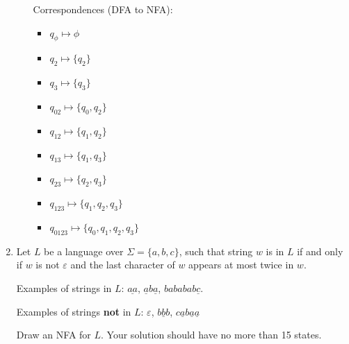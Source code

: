 \documentclass[11pt]{article}
\renewcommand{\epsilon}{\varepsilon}
\begin{document}
\begin{enumerate}
\begin{enumerate}
    Correspondences (DFA to NFA):
    \begin{itemize}
        \item %
        $q_{\phi} \mapsto \phi$
        \item
        $q_2 \mapsto \{q_2\}$
        \item
        $q_3 \mapsto \{q_3\}$
        \item
        $q_{02} \mapsto \{q_0, q_2\}$
        \item
        $q_{12} \mapsto \{q_1, q_2\}$
        \item
        $q_{13} \mapsto \{q_1, q_3\}$
        \item
        $q_{23} \mapsto \{q_2, q_3\}$
        \item
        $q_{123} \mapsto \{q_1, q_2, q_3\}$
        \item
        $q_{0123} \mapsto \{q_0, q_1, q_2, q_3\}$
    \end{itemize}
\end{enumerate}

\newpage

\item Let $L$ be a language over $\Sigma = \{a, b, c\}$, such that string $w$ is in $L$ if and only if $w$ is not $\epsilon$ and the last character of $w$ appears at most twice in $w$.

Examples of strings in $L$: $\underline{aa}$, $\underline{a}b\underline{a}$, $bababab\underline{c}$.

Examples of strings \textbf{not} in $L$: $\epsilon$, $\underline{bbb}$, $c\underline{a}b\underline{a}\underline{a}$

Draw an NFA for $L$.  Your solution should have no more than 15 states.


\end{enumerate}
\end{document}
